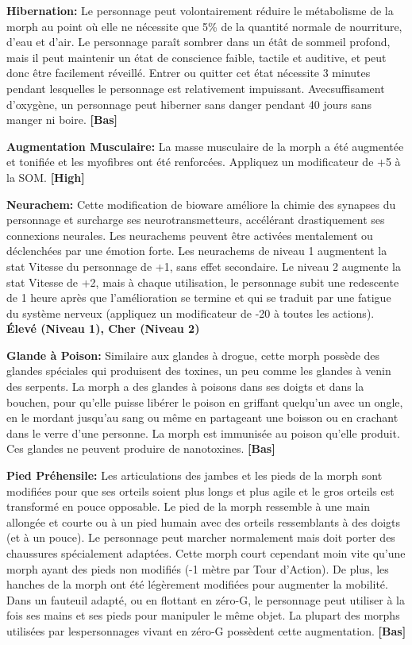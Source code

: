 \textbf{Hibernation:} Le personnage peut volontairement réduire le métabolisme de la morph au point où elle ne nécessite que 5\% de la quantité normale de nourriture, d'eau et d'air. Le personnage paraît sombrer dans un étât de sommeil profond, mais il peut maintenir un état de conscience faible, tactile et auditive, et peut donc être facilement réveillé. Entrer ou quitter cet état nécessite 3 minutes pendant lesquelles le personnage est relativement impuissant. Avecsuffisament d'oxygène, un personnage peut hiberner sans danger pendant 40 jours sans manger ni boire. \textbf{[Bas]} 

\textbf{Augmentation Musculaire:} La masse musculaire de la morph a été augmentée et tonifiée et les myofibres ont été renforcées. Appliquez un modificateur de +5 à la SOM. \textbf{[High]} 

\textbf{Neurachem:} Cette modification de bioware améliore la chimie des synapses du personnage et surcharge ses neurotransmetteurs, accélérant drastiquement ses connexions neurales. Les neurachems peuvent être activées mentalement ou déclenchées par une émotion forte. Les neurachems de niveau 1 augmentent la stat Vitesse du personnage de +1, sans effet secondaire. Le niveau 2 augmente la stat Vitesse de +2, mais à chaque utilisation, le personnage subit une redescente de 1 heure après que l'amélioration se termine et qui se traduit par une fatigue du système nerveux (appliquez un modificateur de -20 à toutes les actions). \textbf{{Élevé (Niveau 1), Cher (Niveau 2)}} 

\textbf{Glande à Poison:} Similaire aux glandes à drogue, cette morph possède des glandes spéciales qui produisent des toxines, un peu comme les glandes à venin des serpents. La morph a des glandes à poisons dans ses doigts et dans la bouchen, pour qu'elle puisse libérer le poison en griffant quelqu'un avec un ongle, en le mordant jusqu'au sang ou même en partageant une boisson ou en crachant dans le verre d'une personne. La morph est immunisée au poison qu'elle produit. Ces glandes ne peuvent produire de nanotoxines. \textbf{[Bas]} 

\textbf{Pied Préhensile:} Les articulations des jambes et les pieds de la morph sont modifiées pour que ses orteils soient plus longs et plus agile et le gros orteils est transformé en pouce opposable. Le pied de la morph ressemble à une main allongée et courte ou à un pied humain avec des orteils ressemblants à des doigts (et à un pouce). Le personnage peut marcher normalement mais doit porter des chaussures spécialement adaptées. Cette morph court cependant moin vite qu'une morph ayant des pieds non modifiés (-1 mètre par Tour d'Action). De plus, les hanches de la morph ont été légèrement modifiées pour augmenter la mobilité. Dans un fauteuil adapté, ou en flottant en zéro-G, le personnage peut utiliser à la fois ses mains et ses pieds pour manipuler le même objet. La plupart des morphs utilisées par lespersonnages vivant en zéro-G possèdent cette augmentation. \textbf{[Bas]} 

